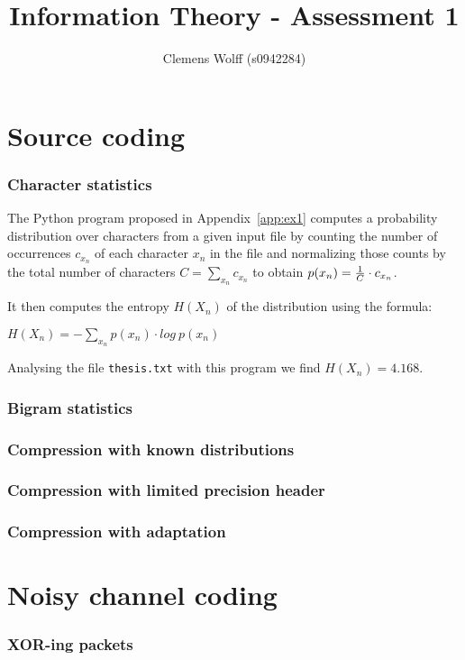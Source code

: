 \documentclass[10pt,a4paper,twoside,twocolumn]{article}
\title{Information Theory - Assessment 1}
\author{Clemens Wolff (s0942284)}
\date{\vspace{-2em}}
\newcommand*{\thesisTXT}{{\tt thesis.txt}\xspace}
\begin{document}
\maketitle


\part{Source coding}

\section{Character statistics}\label{sec:ex1}
The Python program proposed in Appendix~\ref{app:ex1} computes a probability
distribution over characters from a given input file by counting the number of
occurrences $c_{x_n}$ of each character $x_n$ in the file and normalizing those
counts by the total number of characters $C = \sum\limits_{x_n} c_{x_n}$ to
obtain $p(x_n) = {1 \over C} \cdot c_{x_n}$.

It then computes the entropy $H(X_n)$ of the distribution using the formula:
\begin{center}
    $H(X_n) = -\sum\limits_{x_n} p(x_n) \cdot log~p(x_n)$
\end{center}
Analysing the file \thesisTXT with this program we find $H(X_n) = 4.168$.

\section{Bigram statistics}\label{sec:ex2}
\section{Compression with known distributions}\label{sec:ex3}
\section{Compression with limited precision header}\label{sec:ex4}
\section{Compression with adaptation}\label{sec:ex5}


\part{Noisy channel coding}

\section{XOR-ing packets}\label{sec:ex6}
\end{document}

